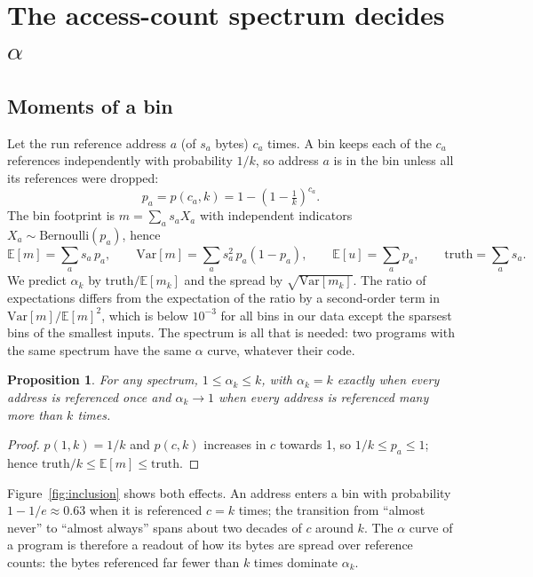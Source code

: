 \documentclass[11pt]{article}
\newcommand{\figref}[1]{Figure~\ref{#1}}
\newcommand{\E}{\mathbb{E}}
\newcommand{\Var}{\mathrm{Var}}
\newtheorem{proposition}{Proposition}
\begin{document}
\clearpage
\section{The access-count spectrum decides $\alpha$}
\label{sec:theory}

\subsection{Moments of a bin}

Let the run reference address $a$ (of $s_a$ bytes) $c_a$ times. A bin keeps each of the $c_a$ references
independently with probability $1/k$, so address $a$ is in the bin unless all its references were dropped:
\begin{equation}
p_a = p(c_a, k) = 1 - \left(1 - \tfrac1k\right)^{c_a}.
\label{eq:p}
\end{equation}
The bin footprint is $m = \sum_a s_a X_a$ with independent indicators $X_a \sim \mathrm{Bernoulli}(p_a)$, hence
\begin{equation}
\E[m] = \sum_a s_a\, p_a, \qquad
\Var[m] = \sum_a s_a^2\, p_a (1-p_a), \qquad
\E[u] = \sum_a p_a, \qquad
\text{truth} = \sum_a s_a .
\label{eq:moments}
\end{equation}
We predict $\alpha_k$ by $\text{truth}/\E[m_k]$ and the spread by $\sqrt{\Var[m_k]}$. The ratio of expectations
differs from the expectation of the ratio by a second-order term in $\Var[m]/\E[m]^2$, which is below $10^{-3}$ for
all bins in our data except the sparsest bins of the smallest inputs. The spectrum is all that is needed: two
programs with the same spectrum have the same $\alpha$ curve, whatever their code.

\begin{proposition}
For any spectrum, $1 \le \alpha_k \le k$, with $\alpha_k = k$ exactly when every address is referenced once
and $\alpha_k \to 1$ when every address is referenced many more than $k$ times.
\end{proposition}
\begin{proof}
$p(1,k) = 1/k$ and $p(c,k)$ increases in $c$ towards 1, so $1/k \le p_a \le 1$; hence
$\text{truth}/k \le \E[m] \le \text{truth}$.
\end{proof}

\figref{fig:inclusion} shows both effects. An address enters a bin with probability $1 - 1/e \approx 0.63$ when it is
referenced $c=k$ times; the transition from ``almost never'' to ``almost always'' spans about two decades of $c$
around $k$. The $\alpha$ curve of a program is therefore a readout of how its bytes are spread over reference
counts: the bytes referenced far fewer than $k$ times dominate $\alpha_k$.
\end{document}
